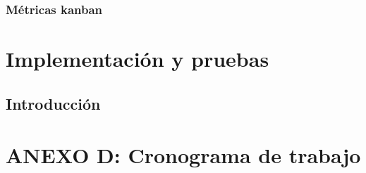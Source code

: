 \documentclass[11pt,oneside,openany]{book}
\begin{document}
\subsection{Métricas kanban}

\chapter{Implementación y pruebas}

\section{Introducción}

\chapter*{ANEXO D: Cronograma de trabajo}

\end{document}
